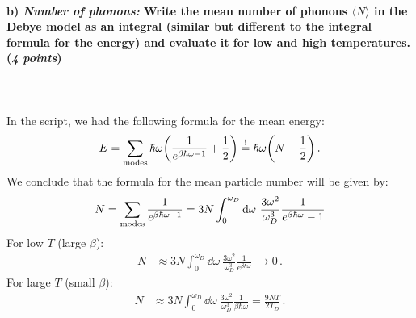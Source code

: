 \paragraph{b) \textit{Number of phonons:} Write the mean number of phonons 
    $\langle N\rangle$ in the Debye model as an integral (similar but 
    different to the integral formula for the energy) and evaluate it for low 
    and high temperatures. (\textit{4 points})
} \ \\
    \\
    In the script, we had the following formula for the mean energy:
    \begin{align}
    \label{energy}
        E
        =\sum_\textnormal{modes}\hbar\omega
        \bigg(\frac{1}{e^{\beta\hbar\omega-1}}+\frac{1}{2}\bigg)
        \overset{!}{=}\hbar\omega
        \bigg(N+\frac{1}{2}\bigg) \,.
    \end{align}
    We conclude that the formula for the mean particle number will be given by:
    \begin{align}
        N
        =\sum_\textnormal{modes}
        \frac{1}{e^{\beta\hbar\omega-1}}
        = 3N\int_0^{\omega_D} \dd\omega \ \frac{3\omega^2}{\omega_D^3}\frac{1}{e^{\beta\hbar\omega}-1}
    \end{align}  %
    For low $T$ (large $\beta$):
    \begin{align}
        N
        &\approx 3N\int_0^{\omega_D} \dd\omega \ \frac{3\omega^2}{\omega_D^3}\frac{1}{e^{\beta\hbar\omega}} \ \longrightarrow 0 \,.
    \end{align}
    For large $T$ (small $\beta$):
    \begin{align}
        N
        &\approx 3N\int_0^{\omega_D} \dd\omega \ \frac{3\omega^2}{\omega_D^3}\frac{1}{\beta\hbar\omega} = \frac{9NT}{2T_D} \,.
    \end{align}
